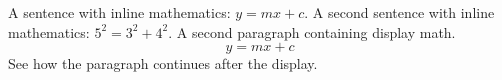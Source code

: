 \documentclass{article}
\begin{document}
A sentence with inline mathematics: $y = mx + c$.
A second sentence with inline mathematics:
$5^{2}=3^{2}+4^{2}$.
A second paragraph containing display math.
\[
y = mx + c
\]
See how the paragraph continues after the display.
\end{document}

